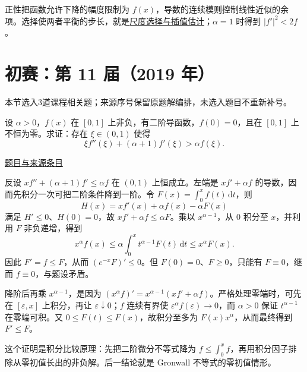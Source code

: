 \documentclass[UTF8,12pt,a4paper,fontset=fandol]{ctexart}
\begin{document}
\begin{remark}[方法与条件]正性把函数允许下降的幅度限制为 $f(x)$，导数的连续模则控制线性近似的余项。选择使两者平衡的步长，就是\hyperref[app:estimate-interpolation]{尺度选择与插值估计}；$\alpha=1$ 时得到 $|f'|^2<2f$。\end{remark}

\section{初赛：第 11 届（2019 年）}

本节选入3道课程相关题；来源序号保留原题解编排，未选入题目不重新补号。

\begin{example}[来源序号2]\label{ex:ch10-11th-A:2}\label{pr:ch10-11th-A:2}

设 $\alpha>0$，$f(x)$ 在 $[0,1]$ 上非负，有二阶导函数，$f(0)=0$，且在 $[0,1]$ 上不恒为零。求证：存在 $\xi\in(0,1)$ 使得
\[
\xi f''(\xi)+(\alpha+1)f'(\xi)>\alpha f(\xi).
\]

\par\href{https://github.com/lzxcr/cmc-mathematics/blob/64916fa1fdbc3e444a652eca204d5669058ee321/src/problems/preliminary/11/02.md}{题目与来源条目}

\end{example}

\begin{solve}\label{ans:ch10-11th-A:2}

反设 $xf''+(\alpha+1)f'\leq\alpha f$ 在 $(0,1)$ 上恒成立。左端是 $xf'+\alpha f$ 的导数，因而先积分一次可把二阶条件降到一阶。令 $F(x)=\int_0^x f(t)\,\mathrm dt$，则
\[
H(x)=xf'(x)+\alpha f(x)-\alpha F(x)
\]
满足 $H'\leq0$、$H(0)=0$，故 $xf'+\alpha f\leq\alpha F$。乘以 $x^{\alpha-1}$，从 $0$ 积分至 $x$，并利用 $F$ 非负递增，得到
\[
x^\alpha f(x)
\leq\alpha\int_0^x t^{\alpha-1}F(t)\,\mathrm dt
\leq x^\alpha F(x).
\]
因此 $F'=f\leq F$，从而 $(e^{-x}F)'\leq0$。但 $F(0)=0$、$F\geq0$，只能有 $F\equiv0$，继而 $f\equiv0$，与题设矛盾。

降阶后再乘 $x^{\alpha-1}$，是因为 $(x^\alpha f)'=x^{\alpha-1}(xf'+\alpha f)$。严格处理零端时，可先在 $[\varepsilon,x]$ 上积分，再让 $\varepsilon\downarrow0$；$f$ 连续有界使 $\varepsilon^\alpha f(\varepsilon)\to0$，而 $\alpha>0$ 保证 $t^{\alpha-1}$ 在零端可积。又 $0\le F(t)\le F(x)$，故积分至多为 $F(x)x^\alpha$，从而最终得到 $F'\le F$。

\end{solve}

\begin{remark}[方法与条件]这个证明是积分比较原理：先把二阶微分不等式降为 $f\leq\int_0^x f$，再用积分因子排除从零初值长出的非负解。后一结论就是 Gronwall 不等式的零初值情形。\end{remark}
\end{document}
